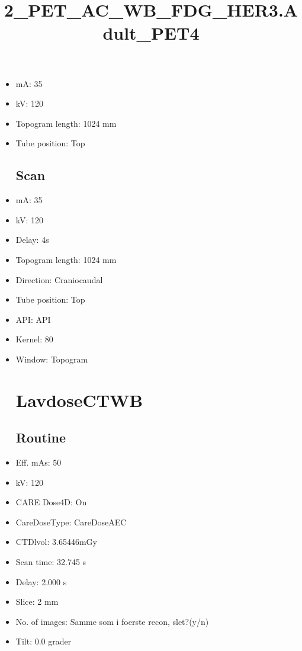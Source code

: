 \documentclass[12pt]{article}
\title{2\_PET\_AC\_WB\_FDG\_HER3.Adult\_PET4}
\begin{document}
\maketitle
\newpage
\tableofcontents
\newpage
{}


\begin{itemize}[noitemsep]\section{Topogram}
\subsection{Routine}
\item mA: 35\item kV: 120\item Topogram length: 1024 mm\item Tube position: Top
\subsection{Scan}\item mA: 35\item kV: 120\item Delay: 4s\item Topogram length: 1024 mm\item Direction: Craniocaudal\item Tube position: Top\item API: API \item Kernel: 80\item Window: Topogram
\section{LavdoseCTWB}
\subsection{Routine}
\item Eff. mAs: 50\item kV: 120\item CARE Dose4D: On\item CareDoseType: CareDoseAEC\item CTDlvol: 3.65446mGy\item Scan time: 32.745 s\item Delay: 2.000 s\item Slice: 2 mm\item No. of images: Samme som i foerste recon, slet?(y/n)\item Tilt: 0.0 grader

\end{itemize}
\end{document}
